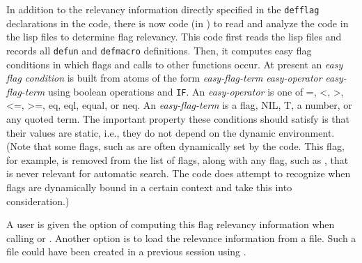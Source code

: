 In addition to the relevancy information directly specified
in the \verb+defflag+ declarations in the code, there
is now code (in ) to read
and analyze the code in the lisp files to determine
flag relevancy.  This code first reads the lisp files
and records all \verb+defun+ and \verb+defmacro+ definitions.
Then, it computes easy flag conditions in which flags
and calls to other functions occur.  At present an {\it easy
flag condition} is built from atoms
of the form {\it easy-flag-term} {\it easy-operator} {\it easy-flag-term}
using boolean operations and \verb+IF+.
An {\it easy-operator} is one of =, <, >, <=, >=, eq, eql, equal, or neq.
An {\it easy-flag-term} is a flag, NIL, T, a number, or any quoted term.
The important property these conditions should satisfy is that their
values are static, i.e., they do not depend on the dynamic environment.
(Note that some flags, such as  are
often dynamically set by the code.  This flag, for example, is removed
from the list of flags, along with any flag, such as ,
that is never relevant for automatic search.  The code does attempt to recognize
when flags are dynamically bound in a certain context and take this into
consideration.)

A user is given the option of computing this flag relevancy information
when calling  or .
Another option is to load the relevance information from a file.
Such a file could have been created in a previous \TPS session
using .








